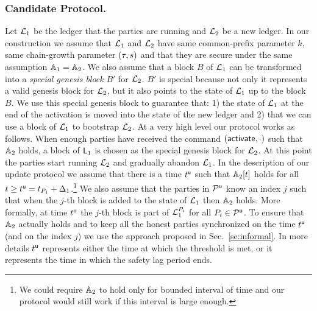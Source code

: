 \subsubsection{Candidate Protocol.}

Let $\mathcal{L}_1$ be the ledger that the parties are running and $\mathcal{L}_2$ be a new ledger.
In our construction we assume that $\mathcal{L}_1$ and $\mathcal{L}_2$ have same common-prefix parameter $k$, same chain-growth parameter $(\tau, s)$ and that they are secure under the same assumption $\mathbb{A}_1=\mathbb{A}_2$. We also assume that a block $B$ of $\mathcal{L}_1$ can be transformed into a \emph{special genesis block} $B'$ for $\mathcal{L}_2$. $B'$ is special because not only
it represents a valid genesis block for $\mathcal{L}_2$, but it also points to the state of $\mathcal{L}_1$ up to the block $B$. 
We use this special genesis block to guarantee that: 1) the state of $\mathcal{L}_1$ at the end of the activation is moved into the state of the new ledger
and 2) that we can use a block of $\mathcal{L}_1$ to bootstrap $\mathcal{L}_2$.
At a very high level our protocol works as follows. When enough parties have received the command $(\mathsf{activate},\cdot)$ such that $\mathbb{A}_2$ holds,
a block of $\mathsf{L}_1$ is chosen as the special genesis block for $\mathcal{L}_2$. At this point the parties start running $\mathcal{L}_2$ and gradually abandon 
$\mathcal{L}_1$.
In the description of our update protocol we assume that there is a time $t^{\mathsf{u}}$ such that $\mathbb{A}_2[t]$ holds for all $t\geq t^{\mathsf{u}}=t_{P_1}+\Delta_1$.\footnote{We could require $\mathbb{A}_2$ to
hold only for bounded interval of time and our protocol would still work if this interval is large enough.}
We also assume that the parties in $\mathcal{P}^\mathsf{u}$ know an index $j$ such that when the $j$-th block is added to the state of $\mathcal{L}_1$ then $\mathbb{A}_2$ holds. 
More formally, at time $t^{\mathsf{u}}$ the $j$-th block is part of $\mathcal{L}_1^{P_i}$ for all $P_i\in\mathcal{P}^\mathsf{u}$.
To ensure that $\mathbb{A}_2$ actually holds and to keep all the honest parties synchronized on the time $t^{\mathsf{u}}$ (and on the index $j$) we use the approach proposed in Sec.~\ref{se:informal}.
In more details $t^{\mathsf{u}}$ represents either the time at which the threshold is met, or it represents the time in which the safety lag period ends.
 


